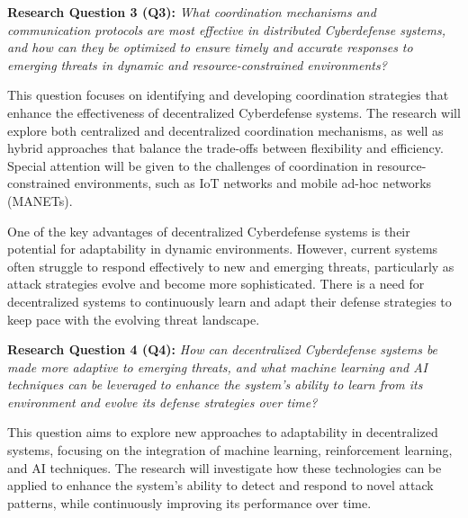 \textbf{Research Question 3 (Q3):} \textit{What coordination mechanisms and communication protocols are most effective in distributed Cyberdefense systems, and how can they be optimized to ensure timely and accurate responses to emerging threats in dynamic and resource-constrained environments?}

This question focuses on identifying and developing coordination strategies that enhance the effectiveness of decentralized Cyberdefense systems. The research will explore both centralized and decentralized coordination mechanisms, as well as hybrid approaches that balance the trade-offs between flexibility and efficiency. Special attention will be given to the challenges of coordination in resource-constrained environments, such as IoT networks and mobile ad-hoc networks (MANETs).


One of the key advantages of decentralized Cyberdefense systems is their potential for adaptability in dynamic environments. However, current systems often struggle to respond effectively to new and emerging threats, particularly as attack strategies evolve and become more sophisticated. There is a need for decentralized systems to continuously learn and adapt their defense strategies to keep pace with the evolving threat landscape.

\textbf{Research Question 4 (Q4):} \textit{How can decentralized Cyberdefense systems be made more adaptive to emerging threats, and what machine learning and AI techniques can be leveraged to enhance the system's ability to learn from its environment and evolve its defense strategies over time?}

This question aims to explore new approaches to adaptability in decentralized systems, focusing on the integration of machine learning, reinforcement learning, and AI techniques. The research will investigate how these technologies can be applied to enhance the system's ability to detect and respond to novel attack patterns, while continuously improving its performance over time.


